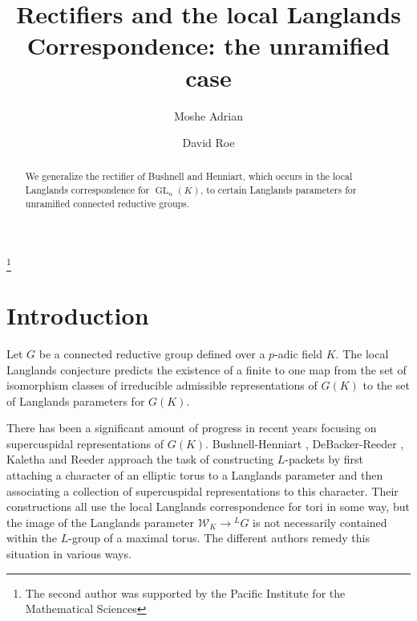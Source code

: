 \documentclass{compositio}
\theoremstyle{plain}
\theoremstyle{definition}
\DeclareMathOperator{\GL}{GL}
\newcommand{\Weil}{\mathcal{W}}
\begin{document}
\title[Rectifiers and the local Langlands Correspondence]{Rectifiers and the local Langlands Correspondence: the unramified case}
\author{Moshe Adrian}
\address{Department of Mathematics, University of Utah, Salt Lake City, UT 84112, U.S.A.}
\author{David Roe}
\address{Department of Mathematics, University of Calgary, Calgary, AB T2N 1N4, Canada}
\thanks{The second author was supported by the Pacific Institute for the Mathematical Sciences}


\begin{abstract}

We generalize the rectifier of Bushnell and Henniart,
which occurs in the local Langlands correspondence for
$\GL_{n}(K)$, to certain Langlands parameters for
unramified connected reductive groups.

\end{abstract}

\maketitle

\section{Introduction} \label{section:intro}

Let $G$ be a connected reductive group defined over a $p$-adic field $K$.
The local Langlands conjecture predicts the existence of a finite to one map
from the set of isomorphism classes of irreducible admissible representations
of $G(K)$ to the set of Langlands parameters for $G(K)$.

There has been a significant amount of progress in recent years
focusing on supercuspidal representations of $G(K)$.  Bushnell-Henniart \cite{bushnell-henniart:10a},
DeBacker-Reeder \cite{reeder-debacker:09a}, Kaletha \cite{kaletha:13a} and Reeder \cite{reeder:08a}
approach the task of constructing $L$-packets by first attaching
a character of an elliptic torus to a Langlands parameter and
then associating a collection of supercuspidal representations to this character.
Their constructions all use the local Langlands correspondence for tori in some way,
but the image of the Langlands parameter $\Weil_K \rightarrow {}^L G$ is not
necessarily contained within the $L$-group of a maximal torus.  The different authors
remedy this situation in various ways.
\end{document}
